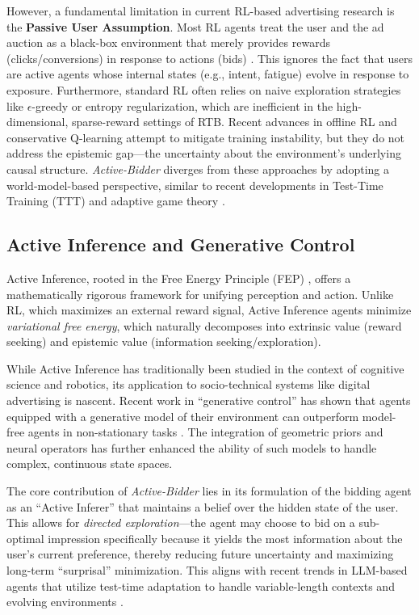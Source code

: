 However, a fundamental limitation in current RL-based advertising research is the \textbf{Passive User Assumption}. Most RL agents treat the user and the ad auction as a black-box environment that merely provides rewards (clicks/conversions) in response to actions (bids) \citep{silver2016mastering}. This ignores the fact that users are active agents whose internal states (e.g., intent, fatigue) evolve in response to exposure. Furthermore, standard RL often relies on naive exploration strategies like $\epsilon$-greedy or entropy regularization, which are inefficient in the high-dimensional, sparse-reward settings of RTB. Recent advances in offline RL and conservative Q-learning \citep{levine2020offline} attempt to mitigate training instability, but they do not address the epistemic gap—the uncertainty about the environment's underlying causal structure. \textit{Active-Bidder} diverges from these approaches by adopting a world-model-based perspective, similar to recent developments in Test-Time Training (TTT) and adaptive game theory \citep{sun2024learning, yang2024zero}.

\subsection{Active Inference and Generative Control}
Active Inference, rooted in the Free Energy Principle (FEP) \citep{friston2010free}, offers a mathematically rigorous framework for unifying perception and action. Unlike RL, which maximizes an external reward signal, Active Inference agents minimize \textit{variational free energy}, which naturally decomposes into extrinsic value (reward seeking) and epistemic value (information seeking/exploration).

While Active Inference has traditionally been studied in the context of cognitive science and robotics, its application to socio-technical systems like digital advertising is nascent. Recent work in ``generative control'' has shown that agents equipped with a generative model of their environment can outperform model-free agents in non-stationary tasks \citep{peebles2023scalable}. The integration of geometric priors \citep{bronstein2024geometric} and neural operators \citep{kovachki2023neural, lu2024physics} has further enhanced the ability of such models to handle complex, continuous state spaces.

The core contribution of \textit{Active-Bidder} lies in its formulation of the bidding agent as an ``Active Inferer'' that maintains a belief over the hidden state of the user. This allows for \textit{directed exploration}—the agent may choose to bid on a sub-optimal impression specifically because it yields the most information about the user’s current preference, thereby reducing future uncertainty and maximizing long-term ``surprisal'' minimization. This aligns with recent trends in LLM-based agents that utilize test-time adaptation to handle variable-length contexts and evolving environments \citep{reid2024llama, sun2024learning}.

